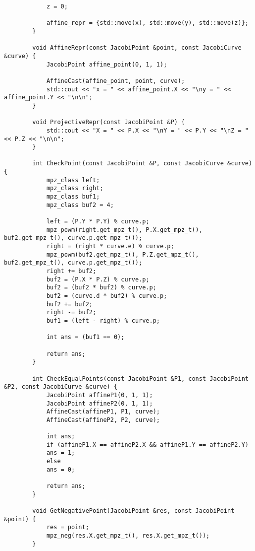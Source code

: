 \documentclass[a4paper,12pt]{article}
\begin{document}
\begin{verbatim}
			z = 0;
			
			affine_repr = {std::move(x), std::move(y), std::move(z)};
		}
		
		void AffineRepr(const JacobiPoint &point, const JacobiCurve &curve) {
			JacobiPoint affine_point(0, 1, 1);
			
			AffineCast(affine_point, point, curve);
			std::cout << "x = " << affine_point.X << "\ny = " << affine_point.Y << "\n\n";
		}
		
		void ProjectiveRepr(const JacobiPoint &P) {
			std::cout << "X = " << P.X << "\nY = " << P.Y << "\nZ = " << P.Z << "\n\n";
		}
		
		int CheckPoint(const JacobiPoint &P, const JacobiCurve &curve) {
			mpz_class left;
			mpz_class right;
			mpz_class buf1;
			mpz_class buf2 = 4;
			
			left = (P.Y * P.Y) % curve.p;
			mpz_powm(right.get_mpz_t(), P.X.get_mpz_t(), buf2.get_mpz_t(), curve.p.get_mpz_t());
			right = (right * curve.e) % curve.p;
			mpz_powm(buf2.get_mpz_t(), P.Z.get_mpz_t(), buf2.get_mpz_t(), curve.p.get_mpz_t());
			right += buf2;
			buf2 = (P.X * P.Z) % curve.p;
			buf2 = (buf2 * buf2) % curve.p;
			buf2 = (curve.d * buf2) % curve.p;
			buf2 += buf2;
			right -= buf2;
			buf1 = (left - right) % curve.p;
			
			int ans = (buf1 == 0);
			
			return ans;
		}
		
		int CheckEqualPoints(const JacobiPoint &P1, const JacobiPoint &P2, const JacobiCurve &curve) {
			JacobiPoint affineP1(0, 1, 1);
			JacobiPoint affineP2(0, 1, 1);
			AffineCast(affineP1, P1, curve);
			AffineCast(affineP2, P2, curve);
			
			int ans;
			if (affineP1.X == affineP2.X && affineP1.Y == affineP2.Y)
			ans = 1;
			else
			ans = 0;
			
			return ans;
		}
		
		void GetNegativePoint(JacobiPoint &res, const JacobiPoint &point) {
			res = point;
			mpz_neg(res.X.get_mpz_t(), res.X.get_mpz_t());
		}
	\end{verbatim}
\end{document}
